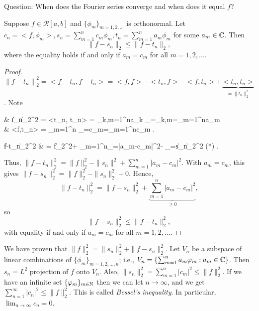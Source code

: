 Question: When does the Fourier series converge and when does it equal $f$?
\begin{thm}[11]
	Suppose $f \in \mathscr{R}[a,b]$ and $\{\phi_m\}_{m=1,2,\ldots }$ is orthonormal. Let $c_{n}= < f, \phi_m> , s_n= \sum_{m=1}^{n}{c_m \phi_m}, t_n= \sum_{m=1}^{n}{a_m \phi_m}$ for some $a_m \in \mathbb{C}$. Then
	\[
		\|f-s_n\|_{2} \le \|f-t_n\|_2
		,\] where the equality holds if and only if $a_m=c_m$ for all $m=1,2,\ldots $.
	\begin{proof}
		${\|f-t_n\|}_{2}^{2}= <f-t_n, f-t_n> = <f,f > - <t_n, f> - <f,t_n> + \underbrace{<t_n, t_n>}_{=\|t_n\|_{2}^{2}}$.
		Note
		\begin{flalign*}
			 & \|t_n\|_{2}^{2}  = <t_n, t_n> = \sum_{k,m=1}^{n}{a_k  _{=\delta_{k,m}}}=\sum_{m=1}^{n}{a_m }                                                                                 \tag{*} \\
			 & <f,t_n>          = \sum_{m=1}^{n}{ _{=c_m}}=\sum_{m=1}^{n}{c_m}
			.\end{flalign*}
		\begin{flalign*}
			\|f-t_n\|_{2}^{2} & = \|f\|_{2}^{2}+ \sum_{m=1}^{n}{_{=\left|a_m-c_m\right|^2}}- _{=\|s_n\|_{2}^2 \text{ by } (*)}
			.\end{flalign*}
		Thus, $\|f-t_n\|_{2}^2=\|f\|_{2}^2 - \|s_n\|^2+\sum_{m=1}^{n}{\left|a_m-c_m\right|^2}$. With $a_m=c_m$, this gives $\|f-s_n\|_{2}^2=\|f\|_2^{2}-\|s_n\|_{2}^2+0$.
		Hence,
		\[
			\|f-t_n\|_{2}^2=\|f-s_n\|_{2}^2+\underbrace{\sum_{m=1}^{n}{\left|a_m-c_m\right|^2}}_{\ge 0}
			,\]
		so \[
			\|f-s_n\|_{2}^2\le \|f-t_n\|_{2}^2
			,\] with equality if and only if $a_m=c_m$ for all $m=1,2,\ldots $.
	\end{proof}
	\begin{note}
		We have proven that $\|f\|_2^{2}=\|s_n\|_2^2+\|f-s_n\|_{2}^2$.
		Let $V_n$ be a subspace of linear combinations of $\{\phi_m\}_{m=1,2,\ldots ,n}$; i.e., $V_n=\left\{ \sum_{m=1}^{n}{a_m \varphi_m}: a_m \in \mathbb{C}\right\}$.
		Then $s_n=L^2$ projection of $f$ onto $V_n$. Also, $\|s_n\|_{2}^2=\sum_{m=1}^{n}{\left|c_m\right|^2}\le \|f\|_{2}^2$.
		If we have an infinite set $\{\varphi_m\}_{m \in \mathbb{N}}$ then we can let $n\to \infty$, and we get $\sum_{n=1}^{\infty}{\left|c_n\right|^2}\le \|f\|_2^{2}$.
		This is called \textit{Bessel's inequality}.
		In particular, $\lim_{n\to \infty}{c_n}=0$.
	\end{note}
\end{thm}

